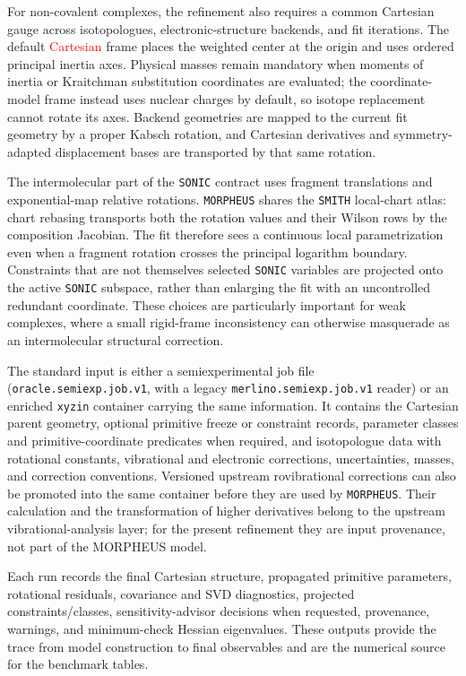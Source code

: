 \documentclass[aip,jcp,reprint,longbibliography,floatfix]{revtex4-2}
\newcommand{\rev}[1]{\textcolor{red}{#1}}
\begin{document}
For non-covalent complexes, the refinement also requires a common Cartesian
gauge across isotopologues, electronic-structure backends, and fit iterations.
The default \rev{Cartesian} frame places the weighted center at the origin and uses
ordered principal inertia axes.  Physical masses remain mandatory when moments
of inertia or Kraitchman substitution coordinates are evaluated; the
coordinate-model frame instead uses nuclear charges by default, so isotope
replacement cannot rotate its axes.  Backend geometries are mapped to the
current fit geometry by a proper Kabsch rotation, and Cartesian derivatives and
symmetry-adapted displacement bases are transported by that same rotation.

The intermolecular part of the \texttt{SONIC} contract uses fragment
translations and exponential-map relative rotations.  \texttt{MORPHEUS}
shares the \texttt{SMITH} local-chart atlas: chart rebasing transports both the
rotation values and their Wilson rows by the composition Jacobian.  The fit
therefore sees a continuous local parametrization even when a fragment
rotation crosses the principal logarithm boundary.  Constraints that are not
themselves selected \texttt{SONIC} variables are projected onto the active
\texttt{SONIC} subspace, rather than enlarging the fit with an uncontrolled
redundant coordinate.  These choices are particularly important for weak
complexes, where a small rigid-frame inconsistency can otherwise masquerade as
an intermolecular structural correction.

The standard input is either a semiexperimental job file
(\texttt{oracle.semiexp.job.v1}, with a legacy
\texttt{merlino.semiexp.job.v1} reader) or an enriched \texttt{xyzin}
container carrying the same information. It contains the Cartesian parent
geometry, optional primitive freeze or constraint records, parameter classes
and primitive-coordinate predicates when required, and isotopologue data with
rotational constants, vibrational and electronic corrections, uncertainties,
masses, and correction conventions. Versioned upstream rovibrational
corrections can also be promoted into the same container before they are used
by \texttt{MORPHEUS}. Their calculation and the transformation of higher
derivatives belong to the upstream vibrational-analysis layer; for the present
refinement they are input provenance, not part of the MORPHEUS model.

Each run records the final Cartesian structure, propagated primitive
parameters, rotational residuals, covariance and SVD diagnostics, projected
constraints/classes, sensitivity-advisor decisions when requested, provenance,
warnings, and minimum-check Hessian eigenvalues. These outputs provide the
trace from model construction to final observables and are the numerical
source for the benchmark tables.
\end{document}
